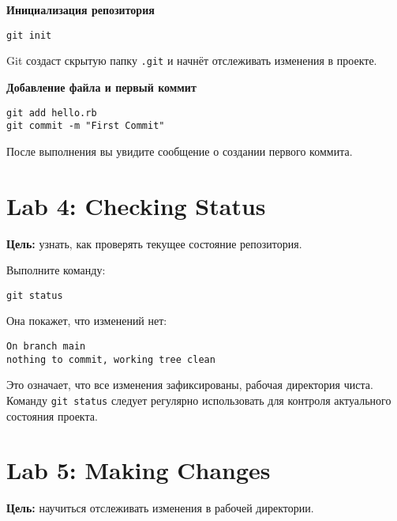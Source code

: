 \documentclass[a4paper,12pt]{report}
\begin{document}
\textbf{Инициализация репозитория}

\begin{verbatim}
git init
\end{verbatim}

Git создаст скрытую папку \texttt{.git} и начнёт отслеживать изменения в проекте.


\textbf{Добавление файла и первый коммит}

\begin{verbatim}
git add hello.rb
git commit -m "First Commit"
\end{verbatim}

После выполнения вы увидите сообщение о создании первого коммита.


\section{Lab 4: Checking Status}
\textbf{Цель:} узнать, как проверять текущее состояние репозитория.

Выполните команду:
\begin{verbatim}
git status
\end{verbatim}

Она покажет, что изменений нет:
\begin{verbatim}
On branch main
nothing to commit, working tree clean
\end{verbatim}

Это означает, что все изменения зафиксированы, рабочая директория чиста. Команду \texttt{git status} следует регулярно использовать для контроля актуального состояния проекта.


\section{Lab 5: Making Changes}
\textbf{Цель:} научиться отслеживать изменения в рабочей директории.
\end{document}
